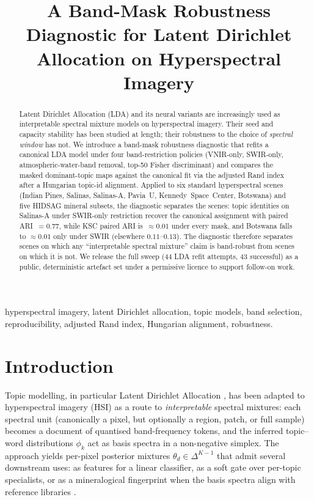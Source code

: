 \documentclass[conference,a4paper,10pt]{IEEEtran}
\title{A Band-Mask Robustness Diagnostic for Latent Dirichlet
Allocation on Hyperspectral Imagery}
\author{%
  \IEEEauthorblockN{Felipe Santib\'a\~nez-Leal~\orcidlink{0000-0002-0150-3246}}
  \IEEEauthorblockA{Independent Researcher\\
  Santiago, Chile\\
  ORCID: 0000-0002-0150-3246\\
  Email: \texttt{fsantibanezleal@ug.uchile.cl}}%
}
\begin{document}
\maketitle

\begin{abstract}
Latent Dirichlet Allocation (LDA) and its neural variants are
increasingly used as interpretable spectral mixture models on
hyperspectral imagery. Their seed and capacity stability has been
studied at length; their robustness to the choice of \emph{spectral
window} has not. We introduce a band-mask robustness diagnostic that
refits a canonical LDA model under four band-restriction policies
(VNIR-only, SWIR-only, atmospheric-water-band removal, top-50 Fisher
discriminant) and compares the masked dominant-topic maps against the
canonical fit via the adjusted Rand index after a Hungarian topic-id
alignment. Applied to six standard hyperspectral scenes (Indian
Pines, Salinas, Salinas-A, Pavia~U, Kennedy~Space~Center, Botswana)
and five HIDSAG mineral subsets, the diagnostic separates the
scenes: topic identities on Salinas-A under SWIR-only restriction
recover the canonical assignment with paired ARI~$=0.77$, while
KSC paired ARI is~$\approx 0.01$ under every mask, and Botswana falls
to $\approx 0.01$ only under SWIR (elsewhere $0.11$--$0.13$).
The diagnostic therefore separates scenes on which any
``interpretable spectral mixture'' claim is band-robust from scenes
on which it is not. We release the full sweep (44 LDA refit
attempts, 43 successful)
as a public, deterministic artefact set under a permissive licence
to support follow-on work.
\end{abstract}

\begin{IEEEkeywords}
hyperspectral imagery, latent Dirichlet allocation, topic models,
band selection, reproducibility, adjusted Rand index, Hungarian
alignment, robustness.
\end{IEEEkeywords}

\section{Introduction}

Topic modelling, in particular Latent Dirichlet Allocation
\cite{blei2003lda}, has been adapted to hyperspectral imagery (HSI)
as a route to \emph{interpretable} spectral mixtures: each spectral
unit (canonically a pixel, but optionally a region, patch, or full
sample) becomes a document of quantised band-frequency tokens, and the
inferred topic--word distributions $\phi_k$ act as basis spectra in
a non-negative simplex. The approach yields per-pixel posterior
mixtures $\theta_d \in \Delta^{K-1}$ that admit several downstream
uses: as features for a linear classifier, as a soft gate over
per-topic specialists, or as a mineralogical fingerprint when the
basis spectra align with reference libraries
\cite{zou2017pmlda,bioucasdias2012unmixing}.
\end{document}
